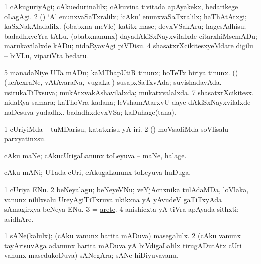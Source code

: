\noindent\gl{\nuga}
\bmng
\bnum
\num{1}  cAkuguriyAgi; cAkuedurinalilx; cAkuvina tivitada apAyakekx, bedarikege oLagAgi. 
\num{2}  (\AmA) `A' enunxvaSaTxralilx; `cAku' enunxvaSaTxralilx; haThAtAtxgi; kaSxNakAladalilx. 
  
\banum
{} (obabxna meVle) katitx mase; devxVSakAru; hagesAdhisu; badadhxveYra tALu. 
 (obabxnanunx) dayadAkiSxNayxvilalxde citarxhiMsemADu; marukavilalxde kADu; nidaRyavAgi piVDisu. 
\eanum
\numie
\num{4}  shasatxrXcikitesxyeMdare digilu -- biVLu, vipariVta bedaru. 
\num{5}  manadaNiye UTa mADu; kaMThapUtiR tinunx; hoTeTx biriya tinunx. 
  (\AmA) (ucAcxraNe, vAtAvaraNa, \mo vugaLa \vi) 
\banum
{} susapxSaTxvAda; suvishadavAda. 
 usirukaTiTxsuva; mukAtxvakAshavilalxda; mukatxvalalxda. 
\eanum
\numie
\num{7}  shasatxrXcikitesx. 
  
\banum
{} nidaRya samara; kaThoVra kadana; leVshamAtarxvU daye dAkiSxNayxvilalxde naDesuva yudadhx. 
 badadhxdevxVSa; kaDuhage(tana). 
\eanum
\numie
\enum
\emng
\eentry

\bentry
{}
\gl{\sakirx}
\bmng
\bnum
\num{1} cUriyiMda -- tuMDarisu, katatxrisu yA iri. 
\num{2} (\ame) moVsadiMda soVlisalu parxyatinxsu. 
\enum
\emng
\eentry

\bentry
{}
\gl{\nA}
\bmng
cAku maNe; cAkucUrigaLanunx toLeyuva -- maNe, halage. 
\emng
\eentry

\bentry
{}
\gl{\nA}
\bmng
cAku mANi; UTada cUri, cAkugaLanunx toLeyuva huDuga. 
\emng
\eentry

\bentry
{}
\gl{\nA}
\bmng
\bnum
\num{1} cUriya ENu. 
\num{2} beNeyalagu; beNeyeVNu; veYjAcnxnika tulAdaMDa, loVlaka, \mo vanunx nililxsalu UreyAgiTiTxruva ukikxna yA yAvudeV gaTiTxyAda sAmagirxya beNeya ENu. 
\num{3} = \hyperref{kandict_a.pdf}{A}{arete}{arete}. 
\num{4} anishicxta yA tiVra apAyada sithxti; asidhAre. 
\enum
\emng
\eentry

\bentry
{}
\gl{\nA}
\bmng
\bnum
\num{1} sANe(kalulx); (cAku \mo vanunx harita mADuva) masegalulx. 
\num{2} (cAku \mo vanunx tayArisuvAga adanunx harita mADuva yA biVdigaLalilx tirugADutAtx cUri \mo vanunx masedukoDuva) sANegAra; sANe hiDiyuvavanu. 
\enum
\emng
\eentry


